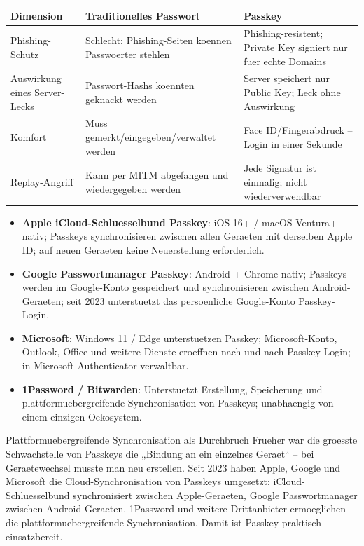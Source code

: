 \begin{center}
\begin{tabularx}{\linewidth}{|X|X|X|}
\hline
\textbf{Dimension} & \textbf{Traditionelles Passwort} & \textbf{Passkey} \tabularnewline
\hline
Phishing-Schutz & Schlecht; Phishing-Seiten koennen Passwoerter stehlen & Phishing-resistent; Private Key signiert nur fuer echte Domains \tabularnewline
Auswirkung eines Server-Lecks & Passwort-Hashs koennten geknackt werden & Server speichert nur Public Key; Leck ohne Auswirkung \tabularnewline
Komfort & Muss gemerkt/eingegeben/verwaltet werden & Face ID/Fingerabdruck – Login in einer Sekunde \tabularnewline
Replay-Angriff & Kann per MITM abgefangen und wiedergegeben werden & Jede Signatur ist einmalig; nicht wiederverwendbar \tabularnewline
\hline
\end{tabularx}
\end{center}


\begin{itemize}
  \item \textbf{Apple iCloud-Schluesselbund Passkey}: iOS 16+ / macOS Ventura+ nativ; Passkeys synchronisieren zwischen allen Geraeten mit derselben Apple ID; auf neuen Geraeten keine Neuerstellung erforderlich.
  \item \textbf{Google Passwortmanager Passkey}: Android + Chrome nativ; Passkeys werden im Google-Konto gespeichert und synchronisieren zwischen Android-Geraeten; seit 2023 unterstuetzt das persoenliche Google-Konto Passkey-Login.
  \item \textbf{Microsoft}: Windows 11 / Edge unterstuetzen Passkey; Microsoft-Konto, Outlook, Office und weitere Dienste eroeffnen nach und nach Passkey-Login; in Microsoft Authenticator verwaltbar.
  \item \textbf{1Password / Bitwarden}: Unterstuetzt Erstellung, Speicherung und plattformuebergreifende Synchronisation von Passkeys; unabhaengig von einem einzigen Oekosystem.
\end{itemize}

\begin{tcbinfo}{Plattformuebergreifende Synchronisation als Durchbruch}
Frueher war die groesste Schwachstelle von Passkeys die „Bindung an ein einzelnes Geraet“ – bei Geraetewechsel musste man neu erstellen. Seit 2023 haben Apple, Google und Microsoft die Cloud-Synchronisation von Passkeys umgesetzt: iCloud-Schluesselbund synchronisiert zwischen Apple-Geraeten, Google Passwortmanager zwischen Android-Geraeten. 1Password und weitere Drittanbieter ermoeglichen die plattformuebergreifende Synchronisation. Damit ist Passkey praktisch einsatzbereit.

\end{tcbinfo}

